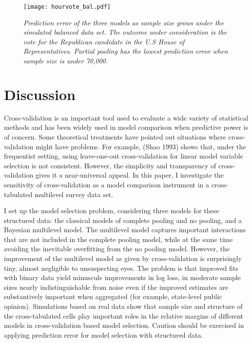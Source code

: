 \begin{figure}[p!]
  \centering
  \texttt{[image: hourvote\_bal.pdf]}
  \caption{\em Prediction error of the three models as sample size grows under the
    simulated balanced data set. The outcome under consideration is the vote for
    the Republican candidate in the U.S House of Representatives. Partial
    pooling has the lowest prediction error when sample size is under 70,000.}
  \label{fig:hourvote_bal}
\end{figure}

\section{Discussion}\label{discussion}

Cross-validation is an important tool used to evaluate a wide variety of
statistical methods and has been widely used in model comparison when
predictive power is of concern. Some theoretical treatments have pointed
out situations where cross-validation might have problems. For example,
(Shao 1993) shows that, under the frequentist setting, using
leave-one-out cross-validation for linear model variable selection is
not consistent. However, the simplicity and transparency of
cross-validation gives it a near-universal appeal. In this paper, I
investigate the sensitivity of cross-validation as a model comparison
instrument in a cross-tabulated multilevel survey data set.

I set up the model selection problem, considering three models for these
structured data: the classical models of complete pooling and no
pooling, and a Bayesian multilevel model. The multilevel model captures
important interactions that are not included in the complete pooling
model, while at the same time avoiding the inevitable overfitting from
the no pooling model. However, the improvement of the multilevel model
as given by cross-validation is surprisingly tiny, almost negligible to
unsuspecting eyes. The problem is that improved fits with binary data
yield minuscule improvements in log loss, in moderate sample sizes
nearly indistinguishable from noise even if the improved estimates are
substantively important when aggregated (for example, state-level public
opinion). Simulations based on real data show that sample size and
structure of the cross-tabulated cells play important roles in the
relative margins of different models in cross-validation based model
selection. Caution should be exercised in applying prediction error for
model selection with structured data.

